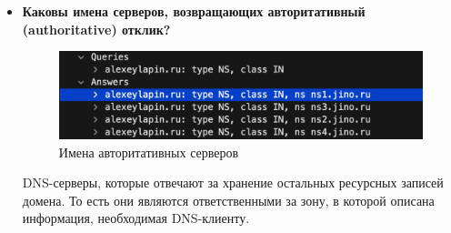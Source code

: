 \documentclass[12pt,onecolumn]{article}
\begin{document}
\begin{itemize}
{    }
    \item {
        \textbf{Каковы имена серверов, возвращающих авторитативный (authoritative) отклик?}
        \begin{figure}[H]
            \centering
            \includegraphics*[width=\textwidth]{image/part6/respNS.png}
            \caption{Имена авторитативных серверов}
        \end{figure}

        DNS-серверы, которые отвечают за хранение остальных ресурсных записей домена. 
        То есть они являются ответственными
за зону, в которой описана информация, необходимая DNS-клиенту.
    }

\end{itemize}
\end{document}
